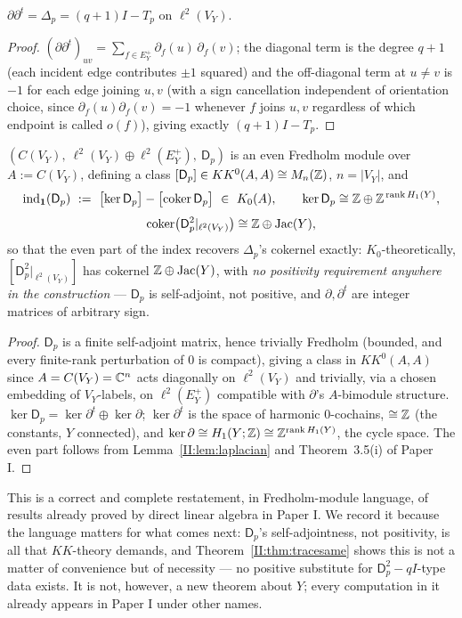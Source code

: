 \begin{lemma}\label{II:lem:laplacian}
$\partial\partial^t=\Delta_p=(q+1)I-T_p$ on $\ell^2(V_Y)$.
\end{lemma}

\begin{proof}
$(\partial\partial^t)_{uv}=\sum_{f\in E_Y^+}\partial_{f}(u)\,\partial_f(v)$; the diagonal
term is the degree $q+1$ (each incident edge contributes $\pm1$ squared) and the
off-diagonal term at $u\ne v$ is $-1$ for each edge joining $u,v$ (with a sign
cancellation independent of orientation choice, since $\partial_f(u)\partial_f(v)=-1$
whenever $f$ joins $u,v$ regardless of which endpoint is called $o(f)$), giving exactly
$(q+1)I-T_p$.
\end{proof}

\begin{theorem}\label{II:thm:index}
$(C(V_Y),\ \ell^2(V_Y)\oplus\ell^2(E_Y^+),\ \mathsf D_p)$ is an even Fredholm module over
$A:=C(V_Y)$, defining a class $[\mathsf D_p]\in KK^0(A,A)\cong M_n(\mathbb{Z})$, $n=|V_Y|$, and
\[
\ind(\mathsf D_p)\ :=\ \bigl[\ker\mathsf D_p\bigr]-\bigl[\coker\mathsf D_p\bigr]
\ \in\ K_0(A),
\qquad
\ker\mathsf D_p\cong\Z\oplus\Z^{\,\rank H_1(Y)},
\]
\[
\operatorname{coker}\bigl(\mathsf D_p^2|_{\ell^2(V_Y)}\bigr)\cong\mathbb{Z}\oplus\operatorname{Jac}(Y),
\]
so that the even part of the index recovers $\Delta_p$'s cokernel exactly:
$K_0$-theoretically, $[\mathsf D_p^2|_{\ell^2(V_Y)}]$ has cokernel $\mathbb{Z}\oplus\operatorname{Jac}(Y)$, with
\emph{no positivity requirement anywhere in the construction} --- $\mathsf D_p$ is
self-adjoint, not positive, and $\partial,\partial^t$ are integer matrices of arbitrary
sign.
\end{theorem}

\begin{proof}
$\mathsf D_p$ is a finite self-adjoint matrix, hence trivially Fredholm (bounded, and
every finite-rank perturbation of $0$ is compact), giving a class in $KK^0(A,A)$ since
$A=C(V_Y)=\mathbb{C}^n$ acts diagonally on $\ell^2(V_Y)$ and trivially, via a chosen embedding of
$V_Y$-labels, on $\ell^2(E_Y^+)$ compatible with $\partial$'s $A$-bimodule structure.
$\ker\mathsf D_p=\ker\partial^t\oplus\ker\partial$; $\ker\partial^t$ is the space of
harmonic $0$-cochains, $\cong\mathbb{Z}$ (the constants, $Y$ connected), and $\ker\partial\cong
H_1(Y;\mathbb{Z})\cong\mathbb{Z}^{\operatorname{rank} H_1(Y)}$, the cycle space. The even part follows from
Lemma~\ref{II:lem:laplacian} and Theorem~3.5(i) of Paper I.
\end{proof}

\begin{remark}\label{II:rem:scope2}
This is a correct and complete restatement, in Fredholm-module language, of results
already proved by direct linear algebra in Paper I. We record it because the language
matters for what comes next: $\mathsf D_p$'s self-adjointness, not positivity, is all
that $KK$-theory demands, and Theorem~\ref{II:thm:tracesame} shows this is not a matter of
convenience but of necessity --- no positive substitute for $\mathsf D_p^2-qI$-type data
exists. It is not, however, a new theorem about $Y$; every computation in it already
appears in Paper I under other names.
\end{remark}

